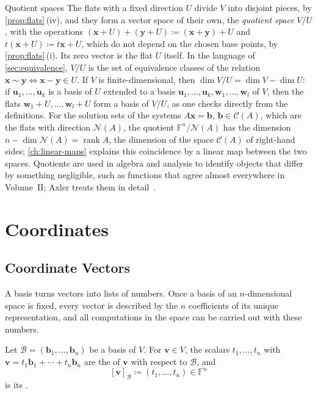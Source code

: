 \begin{note}{Quotient spaces}
The flats with a fixed direction $U$ divide $V$ into disjoint pieces, by \cref{prop:flats}\,(iv), and they form a vector space of their own, the \emph{quotient space} $V/U$, with the operations $(\mathbf x+U)+(\mathbf y+U)\coloneqq(\mathbf x+\mathbf y)+U$ and $t(\mathbf x+U)\coloneqq t\mathbf x+U$, which do not depend on the chosen base points, by \cref{prop:flats}\,(i). Its zero vector is the flat $U$ itself. In the language of \cref{sec:equivalence}, $V/U$ is the set of equivalence classes of the relation $\mathbf x\sim\mathbf y\Leftrightarrow\mathbf x-\mathbf y\in U$. If $V$ is finite-dimensional, then $\dim V/U=\dim V-\dim U$: if $\mathbf u_1,\ldots,\mathbf u_k$ is a basis of $U$ extended to a basis $\mathbf u_1,\ldots,\mathbf u_k,\mathbf w_1,\ldots,\mathbf w_l$ of $V$, then the flats $\mathbf w_1+U,\ldots,\mathbf w_l+U$ form a basis of $V/U$, as one checks directly from the definitions. For the solution sets of the systems $A\mathbf x=\mathbf b$, $\mathbf b\in\mathcal C(A)$, which are the flats with direction $\mathcal N(A)$, the quotient $\mathbb F^n/\mathcal N(A)$ has the dimension $n-\dim\mathcal N(A)=\operatorname{rank}A$, the dimension of the space $\mathcal C(A)$ of right-hand sides; \cref{ch:linear-maps} explains this coincidence by a linear map between the two spaces. Quotients are used in algebra and analysis to identify objects that differ by something negligible, such as functions that agree almost everywhere in Volume~II; Axler treats them in detail~\cite[Sect.~3E]{axler2024}.
\end{note}

\section{Coordinates}
\label{sec:coordinates}

\subsection{Coordinate Vectors}

A basis turns vectors into lists of numbers. Once a basis of an $n$-dimensional space is fixed, every vector is described by the $n$ coefficients of its unique representation, and all computations in the space can be carried out with these numbers.

\begin{definition}[Coordinates]
\label{def:coordinates}
Let $\mathcal B=(\mathbf b_1,\ldots,\mathbf b_n)$ be a basis of $V$. For $\mathbf v\in V$, the scalars $t_1,\ldots,t_n$ with $\mathbf v=t_1\mathbf b_1+\cdots+t_n\mathbf b_n$ are the  of $\mathbf v$ with respect to $\mathcal B$, and
\[
[\mathbf v]_{\mathcal B}\coloneqq(t_1,\ldots,t_n)\in\mathbb F^n
\]
is its .
\end{definition}

